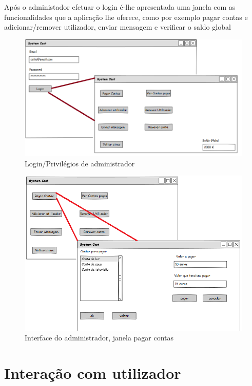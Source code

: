 \newpage
Após o administador efetuar o login é-lhe apresentada uma janela com as funcionalidades que a aplicação lhe oferece, como por exemplo pagar contas e adicionar/remover utilizador, enviar mensagem e verificar o saldo global

\begin{figure}[h!]
	\centering
	\includegraphics[scale=0.5]{imagens/mockups/loginadmin}  
	\caption{Login/Privilégios de administrador }  
\end{figure}


\begin{figure}[h!]
	\centering
	\includegraphics[scale=0.6]{imagens/mockups/AdminpagarContas}  
	\caption{Interface do administrador, janela pagar contas }  
\end{figure}

\newpage

\section{Interação com utilizador}

